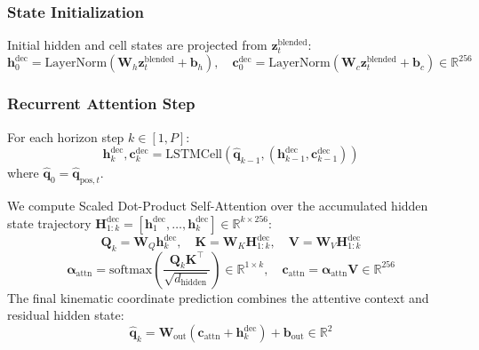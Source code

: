 \documentclass[11pt,a4paper]{article}
\begin{document}
\subsubsection{State Initialization}
Initial hidden and cell states are projected from $\mathbf{z}_t^{\text{blended}}$:
\begin{equation}
    \mathbf{h}_0^{\text{dec}} = \text{LayerNorm}(\mathbf{W}_h \mathbf{z}_t^{\text{blended}} + \mathbf{b}_h), \quad \mathbf{c}_0^{\text{dec}} = \text{LayerNorm}(\mathbf{W}_c \mathbf{z}_t^{\text{blended}} + \mathbf{b}_c) \in \mathbb{R}^{256}
\end{equation}

\subsubsection{Recurrent Attention Step}
For each horizon step $k \in [1, P]$:
\begin{equation}
    \mathbf{h}_k^{\text{dec}}, \mathbf{c}_k^{\text{dec}} = \text{LSTMCell}(\hat{\mathbf{q}}_{k-1}, (\mathbf{h}_{k-1}^{\text{dec}}, \mathbf{c}_{k-1}^{\text{dec}}))
\end{equation}
where $\hat{\mathbf{q}}_0 = \hat{\mathbf{q}}_{\text{pos}, t}$.

We compute Scaled Dot-Product Self-Attention over the accumulated hidden state trajectory $\mathbf{H}_{1:k}^{\text{dec}} = [\mathbf{h}_1^{\text{dec}}, \dots, \mathbf{h}_k^{\text{dec}}] \in \mathbb{R}^{k \times 256}$:
\begin{equation}
    \mathbf{Q}_k = \mathbf{W}_Q \mathbf{h}_k^{\text{dec}}, \quad \mathbf{K} = \mathbf{W}_K \mathbf{H}_{1:k}^{\text{dec}}, \quad \mathbf{V} = \mathbf{W}_V \mathbf{H}_{1:k}^{\text{dec}}
\end{equation}
\begin{equation}
    \boldsymbol{\alpha}_{\text{attn}} = \text{softmax}\left(\frac{\mathbf{Q}_k \mathbf{K}^\top}{\sqrt{d_{\text{hidden}}}}\right) \in \mathbb{R}^{1 \times k}, \quad \mathbf{c}_{\text{attn}} = \boldsymbol{\alpha}_{\text{attn}} \mathbf{V} \in \mathbb{R}^{256}
\end{equation}
The final kinematic coordinate prediction combines the attentive context and residual hidden state:
\begin{equation}
    \hat{\mathbf{q}}_k = \mathbf{W}_{\text{out}} (\mathbf{c}_{\text{attn}} + \mathbf{h}_k^{\text{dec}}) + \mathbf{b}_{\text{out}} \in \mathbb{R}^2
\end{equation}
\end{document}
